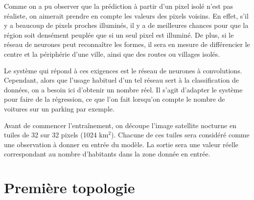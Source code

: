 \documentclass[a4paper, 11pt]{report}
\begin{document}
Comme on a pu observer que la prédiction à partir d'un pixel isolé n'est pas réaliste, on aimerait prendre en compte les valeurs des pixels voisins. En effet, s'il y a beaucoup de pixels proches illuminés, il y a de meilleures chances pour que la région soit densément peuplée que si un seul pixel est illuminé. De plus, si le réseau de neurones peut reconnaître les formes, il sera en mesure de différencier le centre et la périphérie d'une ville, ainsi que des routes ou villages isolés.

Le système qui répond à ces exigences est le réseau de neurones à convolutions. Cependant, alors que l'usage habituel d'un tel réseau sert à la classification de données, on a besoin ici d'obtenir un nombre réel. Il s'agit d'adapter le système pour faire de la régression, ce que l'on fait lorsqu'on compte le nombre de voitures sur un parking par exemple.

Avant de commencer l'entraînement, on découpe l'image satellite nocturne en tuiles de 32 sur 32 pixels (1024 km$^2$). Chacune de ces tuiles sera considéré comme une observation à donner en entrée du modèle. La sortie sera une valeur réelle correspondant au nombre d'habitants dans la zone donnée en entrée.

\section{Première topologie}
\end{document}

